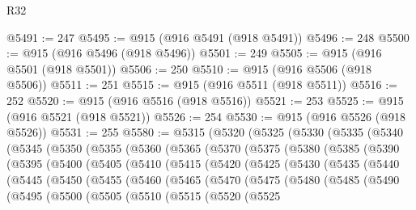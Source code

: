 \begin{lexlean}{R32}
\begin{coremodule}
@5491 := 247
@5495 := @915 (@916 @5491 (@918 @5491))
@5496 := 248
@5500 := @915 (@916 @5496 (@918 @5496))
@5501 := 249
@5505 := @915 (@916 @5501 (@918 @5501))
@5506 := 250
@5510 := @915 (@916 @5506 (@918 @5506))
@5511 := 251
@5515 := @915 (@916 @5511 (@918 @5511))
@5516 := 252
@5520 := @915 (@916 @5516 (@918 @5516))
@5521 := 253
@5525 := @915 (@916 @5521 (@918 @5521))
@5526 := 254
@5530 := @915 (@916 @5526 (@918 @5526))
@5531 := 255
@5580 := @5315
    (@5320
      (@5325
        (@5330
          (@5335
            (@5340
              (@5345
                (@5350
                  (@5355
                    (@5360
                      (@5365
                        (@5370
                          (@5375
                            (@5380
                              (@5385
                                (@5390
                                  (@5395
                                    (@5400
                                      (@5405
                                        (@5410
                                          (@5415
                                            (@5420
                                              (@5425
                                                (@5430
                                                  (@5435
                                                    (@5440
                                                      (@5445
                                                        (@5450
                                                          (@5455
                                                            (@5460
                                                              (@5465
                                                                (@5470
                                                                  (@5475
                                                                    (@5480
                                                                      (@5485
                                                                        (@5490
                                                                          (@5495
                                                                            (@5500
                                                                              (@5505
                                                                                (@5510
                                                                                  (@5515
                                                                                    (@5520
                                                                                      (@5525

\end{coremodule}
\end{lexlean}
